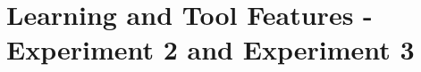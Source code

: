 \section{Learning and Tool Features - Experiment 2 and Experiment 3}
\label{sec_experiments:finalEval}





